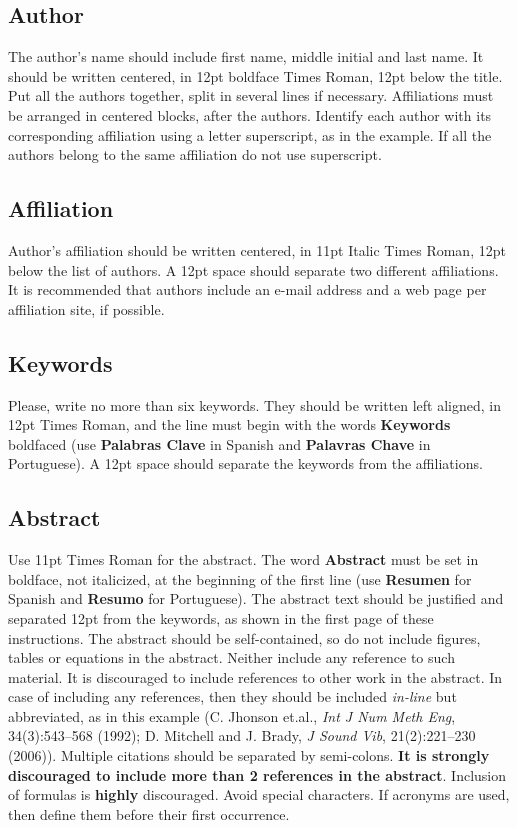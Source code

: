 \documentclass[oneside,a4paper,english,links]{amca}
\begin{document}
\subsection{Author}

The author's name should include first name, middle initial and last
name. It should be written centered, in 12pt boldface Times Roman,
12pt below the title. Put all the authors together, split in several
lines if necessary. Affiliations must be arranged in centered blocks,
after the authors. Identify each author with its corresponding
affiliation using a letter superscript, as in the example. If all the
authors belong to the same affiliation do not use superscript. 

\subsection{Affiliation}

Author's affiliation should be written centered, in 11pt Italic Times Roman,
12pt below the list of authors. A 12pt space should separate two
different affiliations. It is recommended that authors include an
e-mail address and a web page per affiliation site, if possible. 

\subsection{Keywords}

Please, write no more than six keywords.  They should be written left
aligned, in 12pt Times Roman, and the line must begin with the words
{\bf Keywords} boldfaced (use {\bf Palabras Clave} in Spanish and {\bf
Palavras Chave} in Portuguese). A 12pt space should separate the
keywords from the affiliations.

\subsection{Abstract}

Use 11pt Times Roman for the abstract. The word {\bf Abstract} must be
set in boldface, not italicized, at the beginning of the first line
(use {\bf Resumen} for Spanish and {\bf Resumo} for Portuguese). The
abstract text should be justified and separated 12pt from the
keywords, as shown in the first page of these instructions. The
abstract should be self-contained, so do not include figures, tables
or equations in the abstract. Neither include any reference to such
material. It is discouraged to include references to other work in the
abstract. In case of including any references, then they should be
included \emph{in-line} but abbreviated, as in this example (C. Jhonson
et.al., \emph{Int J Num Meth Eng}, 34(3):543--568 (1992); D. Mitchell and
J. Brady, \emph{J Sound Vib}, 21(2):221--230 (2006)). Multiple citations
should be separated by semi-colons. \textbf{It is strongly discouraged
to include more than 2 references in the abstract}. Inclusion of
formulas is \textbf{highly} discouraged. Avoid special
characters. If acronyms are used, then define them before their first
occurrence. 
\end{document}
